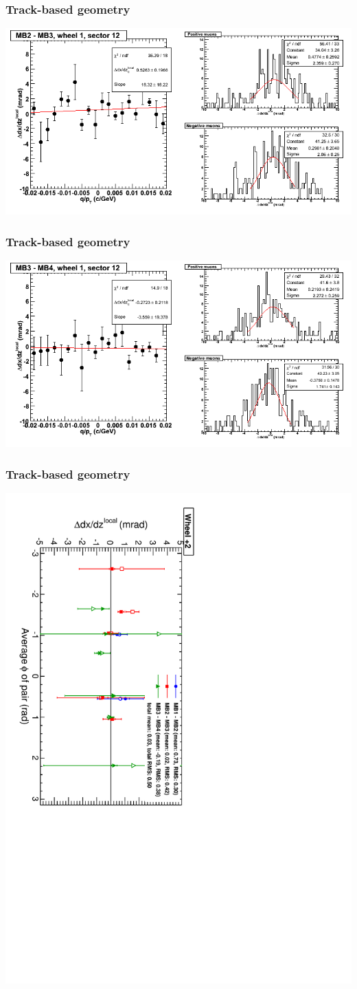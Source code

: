\documentclass[compress]{beamer}
\begin{document}
\begin{frame}
\frametitle{Track-based geometry}
\includegraphics[width=\linewidth]{NOV4_segdiffs/dt13_slope_D_12_23.png}
\end{frame}

\begin{frame}
\frametitle{Track-based geometry}
\includegraphics[width=\linewidth]{NOV4_segdiffs/dt13_slope_D_12_34.png}
\end{frame}

\begin{frame}
\frametitle{Track-based geometry}
\includegraphics[height=\linewidth, angle=90]{NOV4_segdiff_dxdz_whp2.pdf}
\end{frame}
\end{document}
